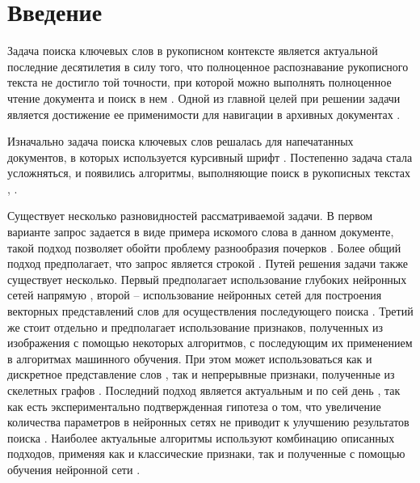 \documentclass{article}
\begin{document}
\section{Введение}
\par Задача поиска ключевых слов в рукописном контексте является актуальной последние десятилетия в силу того, что полноценное распознавание рукописного текста не достигло той точности, при которой можно выполнять полноценное чтение документа и поиск в нем \citep{10.1007/978-3-031-36616-1_15, SOUIBGUI202243}. Одной из главной целей при решении задачи является достижение ее применимости для навигации в архивных документах \citep{10.1007/978-3-319-13695-0_74, 7333824}. 
\par Изначально задача поиска ключевых слов решалась для напечатанных документов, в которых используется курсивный шрифт \citep{627095}. Постепенно задача стала усложняться, и появились алгоритмы, выполняющие поиск в рукописных текстах \citep{1211511}, .
\par Существует несколько разновидностей рассматриваемой задачи. В первом варианте запрос задается в виде примера искомого слова в данном документе, такой подход позволяет обойти проблему разнообразия почерков \citep{7333824, 8378004}. Более общий подход предполагает, что запрос является строкой \citep{retsinas2021from}. Путей решения задачи также существует несколько. Первый предполагает использование глубоких нейронных сетей напрямую \citep{10.1007/978-3-031-41676-7_26, 10.1007/978-3-031-06555-2_26, Cascianelli2022}, второй -- использование нейронных сетей для построения векторных представлений слов для осуществления последующего поиска \citep{retsinas2021from, Krishnan2023, jemni2023stkeys}. Третий же стоит отдельно и предполагает использование признаков, полученных из изображения с помощью некоторых алгоритмов, с последующим их применением в алгоритмах машинного обучения. При этом может использоваться как и дискретное представление слов \citep{8270021, yousfi2021keyword, kundu2021hough}, так и непрерывные признаки, полученные из скелетных графов \citep{7333824, ameri2017keyword, stauffer2016graph}. Последний подход является актуальным и по сей день \citep{yousfi2021keyword, kundu2021hough, banerjee2022z}, так как есть экспериментально подтвержденная гипотеза о том, что увеличение количества параметров в нейронных сетях не приводит к улучшению результатов поиска \citep{rusakov2018expolring}. Наиболее актуальные алгоритмы используют комбинацию описанных подходов, применяя как и классические признаки, так и полученные с помощью обучения нейронной сети \citep{jemni2023stkeys, omayio2023word}.
\end{document}
